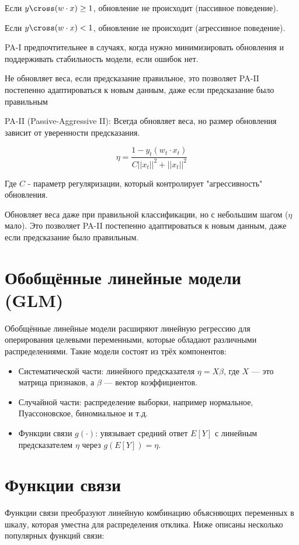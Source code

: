 \begin{itemize}
Если  $y \cross (w \cdot x) \ge 1$, обновление не происходит (пассивное поведение).

Если  $y \cross (w \cdot x) < 1$, обновление не происходит (агрессивное поведение).

PA-I предпочтительнее в случаях, когда нужно минимизировать обновления и поддерживать стабильность модели, если ошибок нет.


Не обновляет веса, если предсказание правильное, это позволяет PA-II постепенно адаптироваться к новым данным, даже если предсказание было правильным


PA-II (Passive-Aggressive II):
Всегда обновляет веса, но размер обновления зависит от уверенности предсказания.


\[
\eta = \frac{1 - y_t(w_t \cdot x_t)}{C||x_t||^2 + ||x_t||^2}
\]

Где $C$ - параметр регуляризации, который контролирует "агрессивность" обновления.


Обновляет веса даже при правильной классификации, но с небольшим шагом ($\eta$ мало).
Это позволяет PA-II постепенно адаптироваться к новым данным, даже если предсказание было правильным.

\section*{Обобщённые линейные модели (GLM)}

Обобщённые линейные модели расширяют линейную регрессию для оперирования целевыми переменными, которые обладают различными распределениями. Такие модели состоят из трёх компонентов:
\begin{itemize}
    \item Систематической части: линейного предсказателя $\eta = X\beta$, где $X$ — это матрица признаков, а $\beta$ — вектор коэффициентов.
    \item Случайной части: распределение выборки, например нормальное, Пуассоновское, биномиальное и т.д.
    \item Функции связи $g(\cdot)$: увязывает средний ответ $E[Y]$ с линейным предсказателем $\eta$ через $g(E[Y]) = \eta$.
\end{itemize}

\section*{Функции связи}

Функции связи преобразуют линейную комбинацию объясняющих переменных в шкалу, которая уместна для распределения отклика. Ниже описаны несколько популярных функций связи:


\end{itemize}
